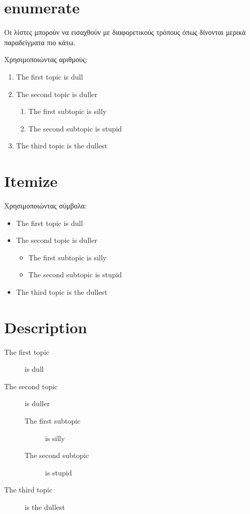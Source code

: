 \section*{enumerate}
Οι λίστες μπορούν να εισαχθούν με διαφορετικούς τρόπους όπως δίνονται μερικά παραδείγματα πιο κάτω.

Χρησιμοποιώντας αριθμούς:
\begin{enumerate}
\item The first topic is dull
\item The second topic is duller
\begin{enumerate}
\item The first subtopic is silly
\item The second subtopic is stupid
\end{enumerate}
\item The third topic is the dullest
\end{enumerate}


\section*{Itemize}
Χρησιμοποιώντας σύμβολα:
\begin{itemize}
\item The first topic is dull
\item The second topic is duller
\begin{itemize}
\item The first subtopic is silly
\item The second subtopic is stupid
\end{itemize}
\item The third topic is the dullest
\end{itemize}

\section*{Description}
\begin{description}
\item[The first topic] is dull
\item[The second topic] is duller
\begin{description}
\item[The first subtopic] is silly
\item[The second subtopic] is stupid
\end{description}
\item[The third topic] is the dullest
\end{description}

